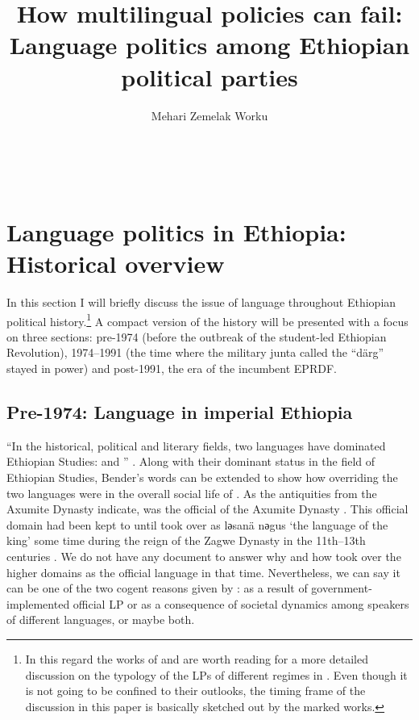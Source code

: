 \documentclass[output=paper,modfonts]{langscibook}
\title{How multilingual policies can fail: Language politics among Ethiopian political parties}
\author{%
Mehari Zemelak Worku\affiliation{Addis Ababa University}
}
\begin{document}
\maketitle
 
 


~
\newpage 
\section{Language politics in Ethiopia: Historical overview}
 

In this section I will briefly discuss the issue of language throughout Ethiopian political history.\footnote{In this regard the works of \citet{Cooper1976,McNab1990,Mekuria1998,GetachewDerib2006,HeughEtAl2007,Smith2008,Mehari2011} and \citet{Zelealem2012} are worth reading for a more detailed discussion on the typology of the LPs of different regimes in .  Even though it is not going to be confined to their outlooks, the timing frame of the discussion in this paper is basically sketched out by the marked works.}  A compact version of the history will be presented with a focus on three sections: pre-1974 (before the outbreak of the student-led Ethiopian Revolution), 1974--1991 (the time where the military junta called the ``därg'' stayed in power) and post-1991, the era of the incumbent EPRDF.
 
\subsection{Pre-1974: Language in imperial Ethiopia}
 

“In the historical, political and literary fields, two languages have dominated Ethiopian Studies:  and ” \citep{BenderEtAl1976intro}. Along with their dominant status in the field of Ethiopian Studies, Bender’s words can be extended to show how overriding the two languages were in the overall social life of . As the antiquities from the Axumite Dynasty indicate,  was the official  of the Axumite Dynasty \citep{Philipson2012}. This official domain had been kept to  until  took over as 
lәsanä nәgus %
`the language of the king' some time during the reign of the Zagwe Dynasty in the 11th–13th centuries \citep{Girma2009}. We do not have any document to answer why and how  took over the higher domains as the official language in that time. Nevertheless, we can say it can be one of the two cogent reasons given by \citet{Cooper1976}: as a result of government-implemented official LP or as a consequence of societal dynamics among speakers of different languages, or maybe both.
\end{document}
